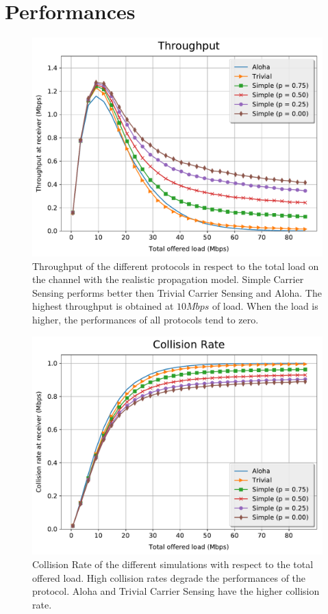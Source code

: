 \section{Performances}
\label{sec:performances}

\begin{figure}[t!]
	\centering
	\centering
	\includegraphics[width=\columnwidth]{figures/plots/realistic_tr}
	\caption{Throughput of the different protocols in respect to the total load on the channel with the realistic propagation model. Simple Carrier Sensing performs better then Trivial Carrier Sensing and Aloha. The highest throughput is obtained at $10 Mbps$ of load. When the load is higher, the performances of all protocols tend to zero.}
	\label{fig:tr}
\end{figure}

\begin{figure}[t!]
	\centering
    \includegraphics[width=\columnwidth]{figures/plots/realistic_cr}
	\caption{Collision Rate of the different simulations with respect to the total offered load. High collision rates degrade the performances of the protocol. Aloha and Trivial Carrier Sensing have the higher collision rate.}
	\label{fig:cr}
\end{figure}

